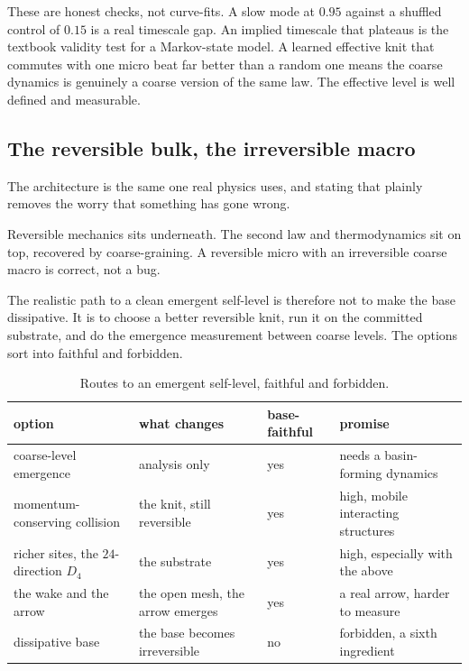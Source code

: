 These are honest checks, not curve-fits. A slow mode at $0.95$ against a shuffled control of $0.15$ is a real timescale gap. An implied timescale that plateaus is the textbook validity test for a Markov-state model. A learned effective knit that commutes with one micro beat far better than a random one means the coarse dynamics is genuinely a coarse version of the same law. The effective level is well defined and measurable.

\subsection{The reversible bulk, the irreversible macro}

The architecture is the same one real physics uses, and stating that plainly removes the worry that something has gone wrong.

\begin{principle}
Reversible mechanics sits underneath. The second law and thermodynamics sit on top, recovered by coarse-graining. A reversible micro with an irreversible coarse macro is correct, not a bug.
\end{principle}

The realistic path to a clean emergent self-level is therefore not to make the base dissipative. It is to choose a better reversible knit, run it on the committed substrate, and do the emergence measurement between coarse levels. The options sort into faithful and forbidden.

\begin{table}[ht]
\centering
\begin{tabular}{@{}llll@{}}
\toprule
option & what changes & base-faithful & promise \\
\midrule
coarse-level emergence & analysis only & yes & needs a basin-forming dynamics \\
momentum-conserving collision & the knit, still reversible & yes & high, mobile interacting structures \\
richer sites, the $24$-direction $D_4$ & the substrate & yes & high, especially with the above \\
the wake and the arrow & the open mesh, the arrow emerges & yes & a real arrow, harder to measure \\
dissipative base & the base becomes irreversible & no & forbidden, a sixth ingredient \\
\bottomrule
\end{tabular}
\caption{Routes to an emergent self-level, faithful and forbidden.}
\label{tab:routes}
\end{table}

